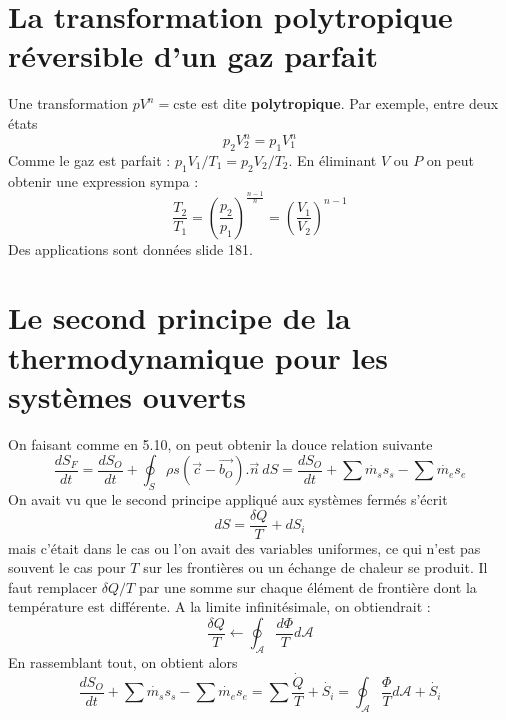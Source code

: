 	\section{La transformation polytropique réversible d’un gaz parfait}
	Une transformation $pV^n = \text{cste}$ est dite \textbf{polytropique}. Par 
	exemple, entre deux états 
	\begin{equation}
	p_2V_2^n = p_1V_1^n
	\end{equation}
	Comme le gaz est parfait : $p_1V_1/T_1=p_2V_2/T_2$. En éliminant $V$ ou $P$ 
	on peut obtenir une expression sympa :
	\begin{equation}
	\dfrac{T_2}{T_1}=\left(\dfrac{p_2}{p_1}\right)^{\frac{n-1}{n}} = \left(\dfrac{
	V_1}{V_2}\right)^{n-1}
	\end{equation}
	Des applications sont données slide 181.
	
	
	\section{Le second principe de la thermodynamique pour les systèmes ouverts}
	On faisant comme en 5.10, on peut obtenir la douce relation suivante 
	\begin{equation}
	\dfrac{dS_F}{dt} = \dfrac{dS_O}{dt} + \oint_S\rho s(\vec{c}-\vec{b_O}).\vec{n}\ 
	dS = \dfrac{dS_O}{dt} + \sum \dot{m_s}s_s - \sum \dot{m_e}s_e
	\end{equation}
	On avait vu que le second principe appliqué aux systèmes fermés s'écrit 
	\begin{equation}
	dS = \dfrac{\delta Q}{T}+dS_i
	\end{equation}
	mais c'était dans le cas ou l'on avait des variables uniformes, ce qui n'est 
	pas souvent le cas pour $T$ sur les frontières ou un échange de chaleur se produit. 
	Il faut remplacer $\delta Q/T$ par une somme sur chaque élément de frontière dont 
	la température est différente. A la limite infinitésimale, on obtiendrait : 
	\begin{equation}
	\dfrac{\delta Q}{T} \leftarrow \oint_{\mathcal{A}} \dfrac{d\Phi}{T}d\mathcal{A}
	\end{equation}
	En rassemblant tout, on obtient alors
	\begin{equation}
	\dfrac{dS_O}{dt} +\sum\dot{m_s}s_s - \sum \dot{m_e}s_e = \sum \dfrac{\dot{Q}}{T}
	+\dot{S_i} = \oint_{\mathcal{A}}\dfrac{\Phi}{T}d\mathcal{A}+\dot{S_i}
	\end{equation}
	
